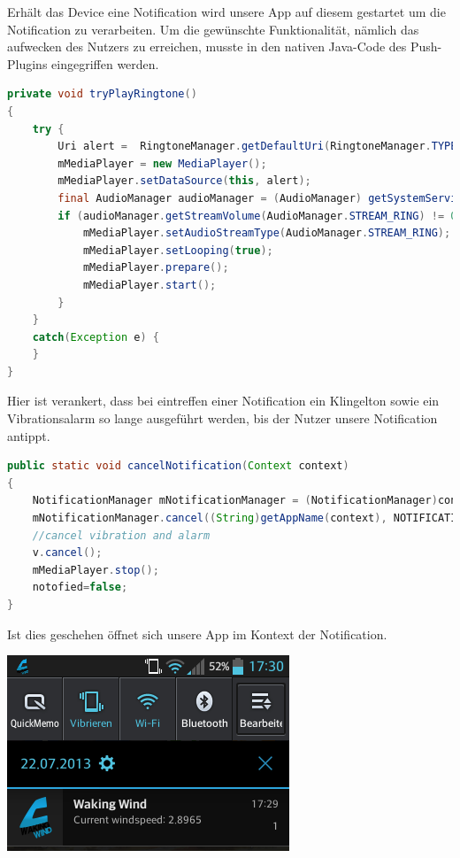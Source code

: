 \documentclass{report}
\begin{document}
Erhält das Device eine Notification wird unsere App auf diesem gestartet um die Notification zu verarbeiten.
Um die gewünschte Funktionalität, nämlich das aufwecken des Nutzers zu erreichen, musste in den nativen Java-Code des Push-Plugins eingegriffen werden.
\begin{lstlisting}[language=Java, caption=Java Code der Weckfunktion , label=cbsp10]
private void tryPlayRingtone() 
{
    try {
        Uri alert =  RingtoneManager.getDefaultUri(RingtoneManager.TYPE_ALARM);
        mMediaPlayer = new MediaPlayer();
        mMediaPlayer.setDataSource(this, alert);
        final AudioManager audioManager = (AudioManager) getSystemService(Context.AUDIO_SERVICE);
        if (audioManager.getStreamVolume(AudioManager.STREAM_RING) != 0) {
            mMediaPlayer.setAudioStreamType(AudioManager.STREAM_RING);
            mMediaPlayer.setLooping(true);
            mMediaPlayer.prepare();
            mMediaPlayer.start();
        }
    } 
    catch(Exception e) {
    }   
}
\end{lstlisting}
Hier ist verankert, dass bei eintreffen einer Notification ein Klingelton sowie ein Vibrationsalarm so lange ausgeführt werden, bis der Nutzer unsere Notification antippt.
\begin{lstlisting}[language=Java, caption=Beim Antippen der Norification , label=cbsp11]
public static void cancelNotification(Context context)
{
    NotificationManager mNotificationManager = (NotificationManager)context.getSystemService(Context.NOTIFICATION_SERVICE);
    mNotificationManager.cancel((String)getAppName(context), NOTIFICATION_ID);
    //cancel vibration and alarm
    v.cancel();
    mMediaPlayer.stop();
    notofied=false;
}
\end{lstlisting}
Ist dies geschehen öffnet sich unsere App im Kontext der Notification.\\[1cm]
\begin{minipage}{0.5\textwidth}
    \centerline{
        \includegraphics[width=\textwidth]{Bilder/notif.png}
    }
\end{minipage}
\end{document}
